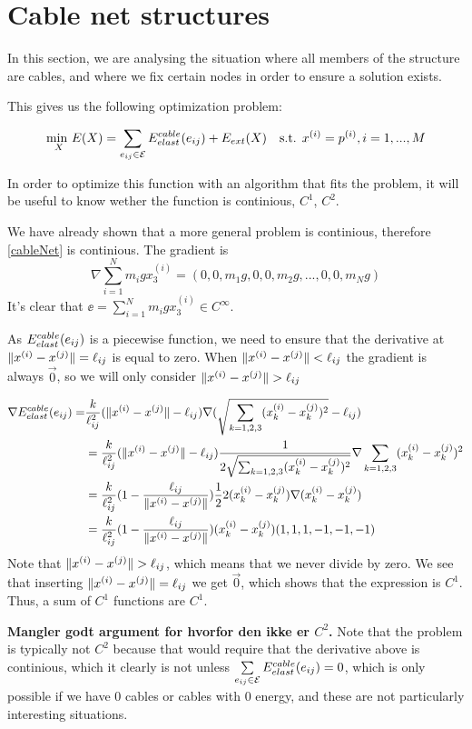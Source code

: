 \section{Cable net structures}
In this section, we are analysing the situation where all members of the structure are cables, and where we fix certain nodes in order to ensure a solution exists.

This gives us the following optimization problem:

\begin{equation}
    \underset{X}{\text{min }} E(X) = \sum\limits_{e_{ij} \in \mathcal{E}} E^{cable}_{elast}(e_{ij}) + E_{ext}(X) \quad \text{s.t. } x^{(i)} = p^{(i)}, i = 1,...,M
    \label{cableNet}
\end{equation}

In order to optimize this function with an algorithm that fits the problem, it will be useful to know wether the function is continious, $C^1$, $C^2$.

We have already shown that a more general problem is continious, therefore \eqref{cableNet} is continious. The gradient is 
\begin{equation}
    \nabla \sum_{i=1}^N m_i g x_3^{(i)}
    = (0,0,m_1 g, 0,0,m_2 g,...,0,0,m_N g)
    \label{gradient_external_force}
\end{equation}
It's clear that $\ee = \sum_{i=1}^N m_i g x_3^{(i)} \in C^{\infty}$. 

As $E^{cable}_{elast}(e_{ij})$ is a piecewise function, we need to ensure that the derivative at $\lVert x^{(i)} - x^{(j)}\rVert = \ell_{ij}$ is equal to zero. When $\lVert x^{(i)} - x^{(j)}\rVert < \ell_{ij}$ the gradient is always $\Vec{0}$, so we will only consider $\lVert x^{(i)} - x^{(j)}\rVert>\ell_{ij}$

\begin{align}
    \nabla E^{cable}_{elast}(e_{ij}) =  &\frac{k}{\ell_{ij}^2}(\lVert x^{(i)} - x^{(j)}\rVert - \ell_{ij}) \nabla (\sqrt{ \sum_{k= 1,2,3}(x_k^{(i)}-x_k^{(j)})^2}-\ell_{ij})\\&=\frac{k}{\ell_{ij}^2} (\lVert x^{(i)} - x^{(j)}\rVert - \ell_{ij}) \frac{1}{2\sqrt{\sum_{k=1,2,3}(x_k^{(i)}-x_k^{(j)})^2}}\nabla \sum_{k=1,2,3}(x_k^{(i)}-x_k^{(j)})^2\\ &= \frac{k}{\ell_{ij}^2} (1 - \frac{\ell_{ij}}{\lVert x^{(i)} - x^{(j)}\rVert}) \frac{1}{2} 2(x_k^{(i)} - x_k^{(j)}) \nabla (x_k^{(i)} - x_k^{(j)})\\ &= \frac{k}{\ell_{ij}^2} (1- \frac{\ell_{ij}}{\lVert x^{(i)} - x^{(j)}\rVert}) (x_k^{(i)} - x_k^{(j)}) ( 1, 1, 1,-1,-1,-1)
\end{align}
Note that $\lVert x^{(i)} - x^{(j)}\rVert>\ell_{ij}$, which means that we never divide by zero. We see that inserting $\lVert x^{(i)} - x^{(j)}\rVert = \ell_{ij}$ we get $\vec{0}$, which shows that the expression is $C^1$. Thus, a sum of $C^1$ functions are $C^1$.

\textbf{Mangler godt argument for hvorfor den ikke er $C^2$.}
Note that the problem is typically not $C^2$ because that would require that the derivative above is continious, which it clearly is not unless
$\sum\limits_{e_{ij} \in \mathcal{E}} E^{cable}_{elast}(e_{ij}) = 0$, which is only possible if we have $0$ cables or cables with $0$ energy, and these are not particularly interesting situations.

